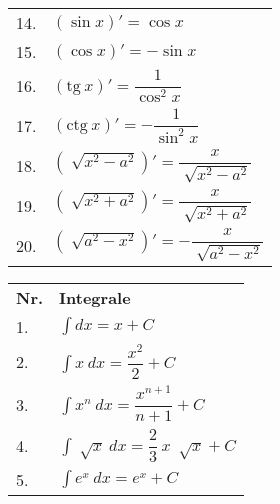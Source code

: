 \documentclass{article}
\begin{document}
\begin{table}[!ht]
\begin{minipage}{0.5\linewidth}
\begin{tabular}{ll}
      14.          & $\left(\sin x\right)' = \cos x$                                 \\

      15.          & $\left(\cos x\right)' = -\sin x$                                \\

      16.          & $\left(\text{tg}\ x\right)' = \dfrac{1}{\cos ^2 x}$             \\

      17.          & $\left(\text{ctg}\ x\right)' = -\dfrac{1}{\sin ^2 x}$           \\

      18.          & $\left(\sqrt[]{x^2-a^2}\right)' = \dfrac{x}{\sqrt[]{x^2-a^2}}$  \\

      19.          & $\left(\sqrt[]{x^2+a^2}\right)' = \dfrac{x}{\sqrt[]{x^2+a^2}}$  \\

      20.          & $\left(\sqrt[]{a^2-x^2}\right)' = -\dfrac{x}{\sqrt[]{a^2-x^2}}$ \\
    \end{tabular}
  \end{minipage}%
  \begin{minipage}{0.5\linewidth}
    \centering
    \begin{tabular}{|m{1cm}|m{6.5cm}|}

      \textbf{Nr.} & \textbf{Integrale}                                                                                            \\

      1.           & $\displaystyle\int dx = x + C $                                                                               \\

      2.           & $\displaystyle\int x\ dx = \dfrac{x^2}{2} + C $                                                               \\

      3.           & $\displaystyle\int x^n\ dx = \dfrac{x^{n+1}}{n+1} + C $                                                       \\

      4.           & $\displaystyle\int \sqrt[]{x}\ dx = \dfrac{2}{3}\ x\ \sqrt[]{x} + C $                                         \\

      5.           & $\displaystyle\int e^x\ dx = e^x + C $                                                                        \\


\end{tabular}
\end{minipage}
\end{table}
\end{document}
